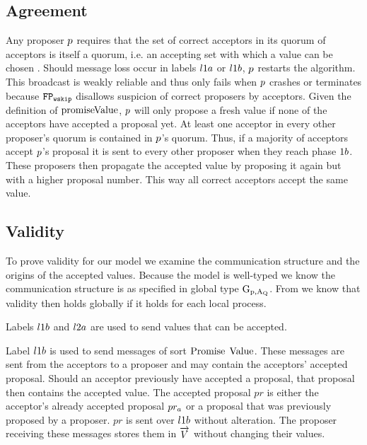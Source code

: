 \subsection{Agreement}
Any proposer $p$ requires that the set of correct acceptors in its quorum of acceptors is itself a quorum, i.e. an accepting set with which a value can be chosen \cite{Lamport06}.
Should message loss occur in labels $l1a$ or $l1b$, $p$ restarts the algorithm.
This broadcast is weakly reliable and thus only fails when $p$ crashes or terminates because $\mathtt{FP_{wskip}}$ disallows suspicion of correct proposers by acceptors.
Given the definition of $\operatorname{promiseValue}$, $p$ will only propose a fresh value if none of the acceptors have accepted a proposal yet.
At least one acceptor in every other proposer's quorum is contained in $p$'s quorum.
Thus, if a majority of acceptors accept $p$'s proposal it is sent to every other proposer when they reach phase $1b$.
These proposers then propagate the accepted value by proposing it again but with a higher proposal number.
This way all correct acceptors accept the same value.

\subsection{Validity}
To prove validity for our model we examine the communication structure and the origins of the accepted values.
Because the model is well-typed we know the communication structure is as specified in global type $\operatorname{G_{p, A_Q}}$.
From \cite{PetersEtal21} we know that validity then holds globally if it holds for each local process.

Labels $l1b$ and $l2a$ are used to send values that can be accepted.

Label $l1b$ is used to send messages of sort $\operatorname{Promise}\; \operatorname{Value}$.
These messages are sent from the acceptors to a proposer and may contain the acceptors' accepted proposal.
Should an acceptor previously have accepted a proposal, that proposal then contains the accepted value.
The accepted proposal $pr$ is either the acceptor's already accepted proposal $pr_{a}$ or a proposal that was previously proposed by a proposer.
$pr$ is sent over $l1b$ without alteration.
The proposer receiving these messages stores them in $\overrightarrow{V}$ without changing their values.

